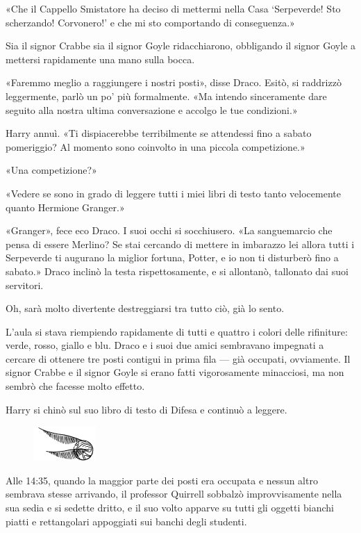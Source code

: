 «Che il Cappello Smistatore ha deciso di mettermi nella Casa ‘Serpeverde! Sto scherzando! Corvonero!’ e che mi sto comportando di conseguenza.»

Sia il signor Crabbe sia il signor Goyle ridacchiarono, obbligando il signor Goyle a mettersi rapidamente una mano sulla bocca.

«Faremmo meglio a raggiungere i nostri posti», disse Draco. Esitò, si raddrizzò leggermente, parlò un po’ più formalmente. «Ma intendo sinceramente dare seguito alla nostra ultima conversazione e accolgo le tue condizioni.»

Harry annuì. «Ti dispiacerebbe terribilmente se attendessi fino a sabato pomeriggio? Al momento sono coinvolto in una piccola competizione.»

«Una competizione?»

«Vedere se sono in grado di leggere tutti i miei libri di testo tanto velocemente quanto Hermione Granger.»

«Granger», fece eco Draco. I suoi occhi si socchiusero. «La sanguemarcio che pensa di essere Merlino? Se stai cercando di mettere in imbarazzo lei allora tutti i Serpeverde ti augurano la miglior fortuna, Potter, e io non ti disturberò fino a sabato.» Draco inclinò la testa rispettosamente, e si allontanò, tallonato dai suoi servitori.

Oh, sarà molto divertente destreggiarsi tra tutto ciò, già lo sento.

L’aula si stava riempiendo rapidamente di tutti e quattro i colori delle rifiniture: verde, rosso, giallo e blu. Draco e i suoi due amici sembravano impegnati a cercare di ottenere tre posti contigui in prima fila — già occupati, ovviamente. Il signor Crabbe e il signor Goyle si erano fatti vigorosamente minacciosi, ma non sembrò che facesse molto effetto.

Harry si chinò sul suo libro di testo di Difesa e continuò a leggere.

\begin{figure}[h!]
        \includegraphics[scale=0.4]{boccino.png}
        \centering
\end{figure}

Alle 14:35, quando la maggior parte dei posti era occupata e nessun altro sembrava stesse arrivando, il professor Quirrell sobbalzò improvvisamente nella sua sedia e si sedette dritto, e il suo volto apparve su tutti gli oggetti bianchi piatti e rettangolari appoggiati sui banchi degli studenti.

